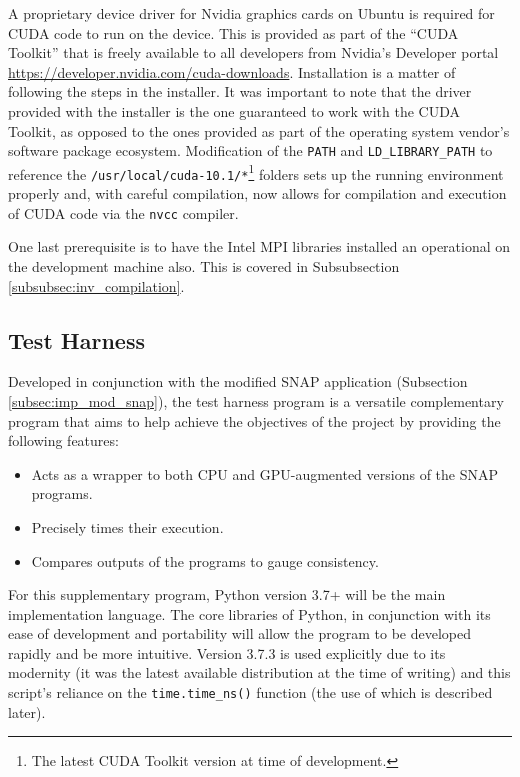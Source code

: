 \documentclass[conference]{IEEEtran}
\begin{document}
A proprietary device driver for Nvidia graphics cards on Ubuntu is required for CUDA code to run on the device. This is provided as part of the ``CUDA Toolkit'' that is freely available to all developers from Nvidia's Developer portal \url{https://developer.nvidia.com/cuda-downloads}. Installation is a matter of following the steps in the installer. It was important to note that the driver provided with the installer is the one guaranteed to work with the CUDA Toolkit, as opposed to the ones provided as part of the operating system vendor's software package ecosystem. Modification of the \texttt{PATH} and \texttt{LD\_LIBRARY\_PATH} to reference the \texttt{/usr/local/cuda-10.1/*}\footnote{The latest CUDA Toolkit version at time of development.} folders sets up the running environment properly and, with careful compilation, now allows for compilation and execution of CUDA code via the \texttt{nvcc} compiler.

One last prerequisite is to have the Intel MPI libraries installed an operational on the development machine also. This is covered in Subsubsection \ref{subsubsec:inv_compilation}.


\subsection{Test Harness}
\label{subsec:imp_testharness}

Developed in conjunction with the modified SNAP application (Subsection \ref{subsec:imp_mod_snap}), the test harness program is a versatile complementary program that aims to help achieve the objectives of the project by providing the following features:

\begin{itemize}
    \item Acts as a wrapper to both CPU and GPU-augmented versions of the SNAP programs.
    \item Precisely times their execution.
    \item Compares outputs of the programs to gauge consistency.
\end{itemize}

For this supplementary program, Python version 3.7+ will be the main implementation language. The core libraries of Python, in conjunction with its ease of development and portability will allow the program to be developed rapidly and be more intuitive. Version 3.7.3 is used explicitly due to its modernity (it was the latest available distribution at the time of writing) and this script's reliance on the \texttt{time.time\_ns()} function (the use of which is described later).
\end{document}

